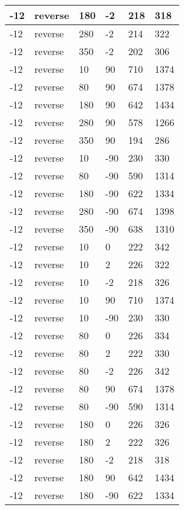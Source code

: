\begin{longtable}{|l|l|l|l|l|l|}
			\hline
			-12 & reverse & 180 & -2 & 218 & 318 \\
			\hline
			-12 & reverse & 280 & -2 & 214 & 322 \\
			\hline
			-12 & reverse & 350 & -2 & 202 & 306 \\
			\hline
			-12 & reverse & 10 & 90 & 710 & 1374 \\
			\hline
			-12 & reverse & 80 & 90 & 674 & 1378 \\
			\hline
			-12 & reverse & 180 & 90 & 642 & 1434 \\
			\hline
			-12 & reverse & 280 & 90 & 578 & 1266 \\
			\hline
			-12 & reverse & 350 & 90 & 194 & 286 \\
			\hline
			-12 & reverse & 10 & -90 & 230 & 330 \\
			\hline
			-12 & reverse & 80 & -90 & 590 & 1314 \\
			\hline
			-12 & reverse & 180 & -90 & 622 & 1334 \\
			\hline
			-12 & reverse & 280 & -90 & 674 & 1398 \\
			\hline
			-12 & reverse & 350 & -90 & 638 & 1310 \\
			\hline
			-12 & reverse & 10 & 0 & 222 & 342 \\
			\hline
			-12 & reverse & 10 & 2 & 226 & 322 \\
			\hline
			-12 & reverse & 10 & -2 & 218 & 326 \\
			\hline
			-12 & reverse & 10 & 90 & 710 & 1374 \\
			\hline
			-12 & reverse & 10 & -90 & 230 & 330 \\
			\hline
			-12 & reverse & 80 & 0 & 226 & 334 \\
			\hline
			-12 & reverse & 80 & 2 & 222 & 330 \\
			\hline
			-12 & reverse & 80 & -2 & 226 & 342 \\
			\hline
			-12 & reverse & 80 & 90 & 674 & 1378 \\
			\hline
			-12 & reverse & 80 & -90 & 590 & 1314 \\
			\hline
			-12 & reverse & 180 & 0 & 226 & 326 \\
			\hline
			-12 & reverse & 180 & 2 & 222 & 326 \\
			\hline
			-12 & reverse & 180 & -2 & 218 & 318 \\
			\hline
			-12 & reverse & 180 & 90 & 642 & 1434 \\
			\hline
			-12 & reverse & 180 & -90 & 622 & 1334 \\

\end{longtable}
